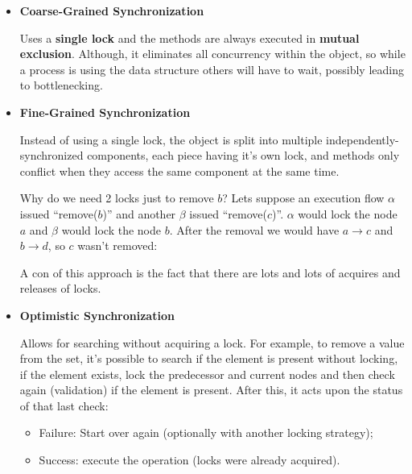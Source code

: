 \begin{itemize}
    \item {\large \textbf{Coarse-Grained Synchronization}}
    \par Uses a \textbf{single lock} and the methods are always executed in \textbf{mutual exclusion}. Although, it eliminates all concurrency within the object, so while a process is using the data structure others will have to wait, possibly leading to bottlenecking.
    \item {\large \textbf{Fine-Grained Synchronization}}
    \par Instead of using a single lock, the object is split into multiple independently-synchronized components, each piece having it's own lock, and methods only conflict when they access the same component at the same time.
%
\clearpage
%
    \par Why do we need 2 locks just to remove $b$? Lets suppose an execution flow $\alpha$ issued \enquote{remove($b$)} and another $\beta$ issued \enquote{remove($c$)}. $\alpha$ would lock the node $a$ and $\beta$ would lock the node $b$. After the removal we would have $a\rightarrow c$ and $b \rightarrow d$, so $c$ wasn't removed:
    \par A {\color{red}con} of this approach is the fact that there are lots and lots of acquires and releases of locks.
    \item {\large \textbf{Optimistic Synchronization}}
    \par Allows for searching without acquiring a lock. For example, to remove a value from the set, it's possible to search if the element is present without locking, if the element exists, lock the predecessor and current nodes and then check again (validation) if the element is present. After this, it acts upon the status of that last check:
    \begin{itemize}
        \item Failure: Start over again (optionally with another locking strategy);
        \item Success: execute the operation (locks were already acquired).
    \end{itemize}
\end{itemize}
